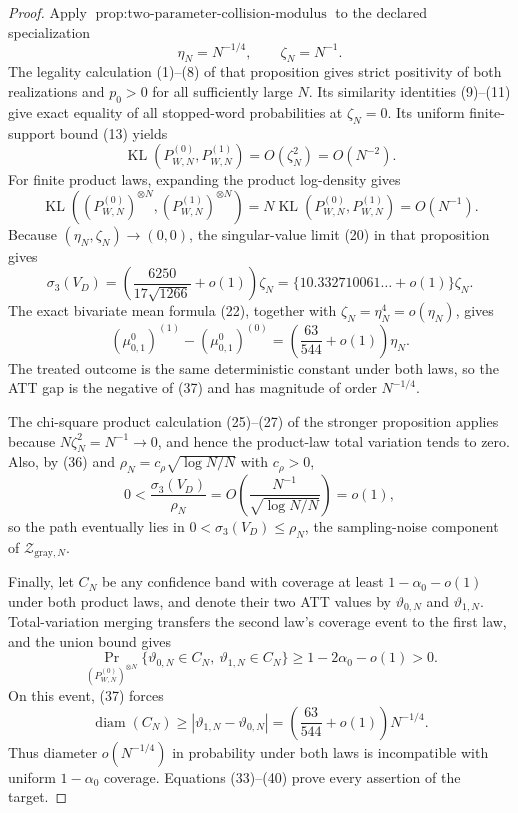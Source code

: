 \documentclass{article}
\begin{document}
\begin{proof}
Apply \(\operatorname{prop:two\text{-}parameter\text{-}collision\text{-}modulus}\) to the declared specialization
\[
 \eta_N=N^{-1/4},\qquad \zeta_N=N^{-1}.                       \tag{33}
\]
The legality calculation (1)--(8) of that proposition gives strict positivity of both realizations and \(p_0>0\) for all sufficiently large \(N\). Its similarity identities (9)--(11) give exact equality of all stopped-word probabilities at \(\zeta_N=0\). Its uniform finite-support bound (13) yields
\[
 \operatorname{KL}(P_{W,N}^{(0)},P_{W,N}^{(1)})=O(\zeta_N^2)=O(N^{-2}). \tag{34}
\]
For finite product laws, expanding the product log-density gives
\[
 \operatorname{KL}\!\left((P_{W,N}^{(0)})^{\otimes N},
                            (P_{W,N}^{(1)})^{\otimes N}\right)
 =N\operatorname{KL}(P_{W,N}^{(0)},P_{W,N}^{(1)})=O(N^{-1}). \tag{35}
\]
Because \((\eta_N,\zeta_N)\to(0,0)\), the singular-value limit (20) in that proposition gives
\[
 \sigma_3(V_D)
 =\left(\frac{6250}{17\sqrt{1266}}+o(1)\right)\zeta_N
 =\{10.332710061\ldots+o(1)\}\zeta_N.                       \tag{36}
\]
The exact bivariate mean formula (22), together with \(\zeta_N=\eta_N^4=o(\eta_N)\), gives
\[
 (\mu^0_{0,1})^{(1)}-(\mu^0_{0,1})^{(0)}
 =\left(\frac{63}{544}+o(1)\right)\eta_N.                   \tag{37}
\]
The treated outcome is the same deterministic constant under both laws, so the ATT gap is the negative of (37) and has magnitude of order \(N^{-1/4}\).

The chi-square product calculation (25)--(27) of the stronger proposition applies because \(N\zeta_N^2=N^{-1}\to0\), and hence the product-law total variation tends to zero. Also, by (36) and \(\rho_N=c_{\rho}\sqrt{\log N/N}\) with \(c_{\rho}>0\),
\[
 0<\frac{\sigma_3(V_D)}{\rho_N}
 =O\!\left(\frac{N^{-1}}{\sqrt{\log N/N}}\right)=o(1),      \tag{38}
\]
so the path eventually lies in \(0<\sigma_3(V_D)\le\rho_N\), the sampling-noise component of \(\mathcal Z_{\mathrm{gray},N}\).

Finally, let \(C_N\) be any confidence band with coverage at least \(1-\alpha_0-o(1)\) under both product laws, and denote their two ATT values by \(\vartheta_{0,N}\) and \(\vartheta_{1,N}\). Total-variation merging transfers the second law's coverage event to the first law, and the union bound gives
\[
 \Pr_{(P_{W,N}^{(0)})^{\otimes N}}\{\vartheta_{0,N}\in C_N,\ \vartheta_{1,N}\in C_N\}
 \ge1-2\alpha_0-o(1)>0.                                      \tag{39}
\]
On this event, (37) forces
\[
 \operatorname{diam}(C_N)\ge|\vartheta_{1,N}-\vartheta_{0,N}|
 =\left(\frac{63}{544}+o(1)\right)N^{-1/4}.                 \tag{40}
\]
Thus diameter \(o(N^{-1/4})\) in probability under both laws is incompatible with uniform \(1-\alpha_0\) coverage. Equations (33)--(40) prove every assertion of the target.
\end{proof}
\end{document}

